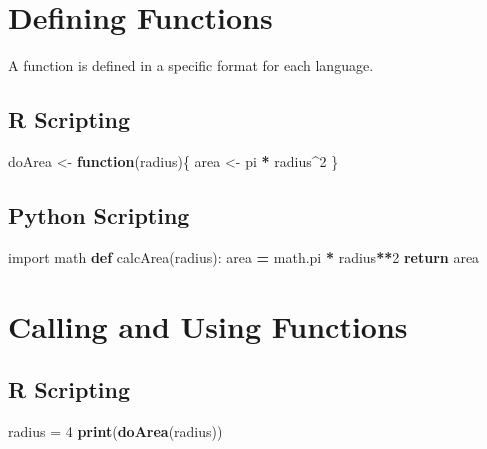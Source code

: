 \documentclass[]{book}
\newenvironment{Shaded}{\begin{snugshade}}{\end{snugshade}}
\newcommand{\KeywordTok}[1]{\textcolor[rgb]{0.13,0.29,0.53}{\textbf{#1}}}
\newcommand{\DecValTok}[1]{\textcolor[rgb]{0.00,0.00,0.81}{#1}}
\newcommand{\StringTok}[1]{\textcolor[rgb]{0.31,0.60,0.02}{#1}}
\newcommand{\ImportTok}[1]{#1}
\newcommand{\ControlFlowTok}[1]{\textcolor[rgb]{0.13,0.29,0.53}{\textbf{#1}}}
\newcommand{\OperatorTok}[1]{\textcolor[rgb]{0.81,0.36,0.00}{\textbf{#1}}}
\newcommand{\NormalTok}[1]{#1}
\theoremstyle{definition}
\theoremstyle{definition}
\theoremstyle{definition}
\theoremstyle{remark}
\begin{document}
\section{Defining Functions}\label{defining-functions}

A function is defined in a specific format for each language.

\subsection{R Scripting}\label{r-scripting-1}

\begin{Shaded}
\begin{Highlighting}[]
\NormalTok{doArea <-}\StringTok{ }\ControlFlowTok{function}\NormalTok{(radius)\{}
\NormalTok{  area <-}\StringTok{ }\NormalTok{pi }\OperatorTok{*}\StringTok{ }\NormalTok{radius}\OperatorTok{^}\DecValTok{2}
\NormalTok{\}}
\end{Highlighting}
\end{Shaded}

\subsection{Python Scripting}\label{python-scripting-1}

\begin{Shaded}
\begin{Highlighting}[]
\ImportTok{import}\NormalTok{ math}
\KeywordTok{def}\NormalTok{ calcArea(radius):}
\NormalTok{  area }\OperatorTok{=}\NormalTok{ math.pi }\OperatorTok{*}\NormalTok{ radius}\OperatorTok{**}\DecValTok{2}
  \ControlFlowTok{return}\NormalTok{ area}
\end{Highlighting}
\end{Shaded}

\section{Calling and Using Functions}\label{calling-and-using-functions}

\subsection{R Scripting}\label{r-scripting-2}

\begin{Shaded}
\begin{Highlighting}[]
\NormalTok{radius =}\StringTok{ }\DecValTok{4}
\KeywordTok{print}\NormalTok{(}\KeywordTok{doArea}\NormalTok{(radius))}
\end{Highlighting}
\end{Shaded}
\end{document}
